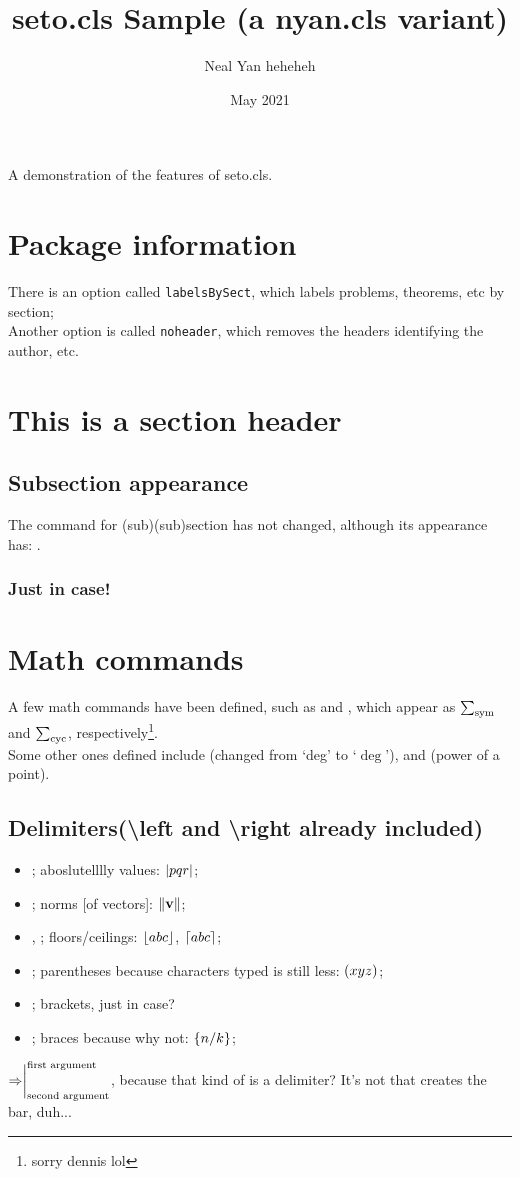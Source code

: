 \documentclass[labelsBySect]{seto}
\title{seto.cls Sample (a nyan.cls variant)}
\author{Neal Yan heheheh}
\date{May 2021}
\begin{document}
\maketitle
A demonstration of the features of seto.cls.
\section*{Package information}
There is an option called \texttt{labelsBySect}, which labels problems, theorems, etc by section;\\
Another option is called \texttt{noheader}, which removes the headers identifying the author, etc.
\toc 
\section{This is a section header}
\subsection{Subsection appearance}
The command for (sub)(sub)section has not changed, although its appearance has: .
\subsubsection{Just in case!}
\section{Math commands}
A few math commands have been defined, such as  and , which appear as $\symsum$ and $\cycsum$, respectively\footnote{sorry dennis lol}.\\
Some other ones defined include (changed from `deg' to `$\deg$'), and (power of a point).
\subsection{Delimiters(\textbackslash left and \textbackslash right already included)}
\begin{itemize}
    \item{}; aboslutelllly values: $\abs{pqr}$;
    \item{}; norms [of vectors]: $\norm{\textbf{v}}$;
    \item{}, ; floors/ceilings: $\floor{abc}$, $\ceil{abc}$;
    \item{}; parentheses because characters typed is still less: $\parenth{xyz}$;
    \item{}; brackets, just in case?
    \item{}; braces because why not: $\braces{n/k}$;
\end{itemize}
$\Rightarrow\evalat[\text{first argument}]{\text{second argument}}$, because that kind of is a delimiter? It's not  that creates the bar, duh...
\end{document}
